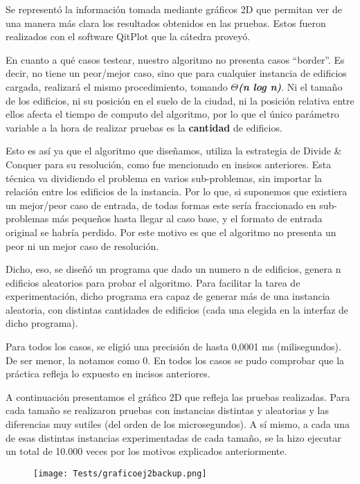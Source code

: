 Se representó la información tomada mediante gráficos 2D que permitan ver de una manera más clara los resultados obtenidos en las pruebas. Estos fueron realizados con el software QitPlot que la cátedra proveyó.

En cuanto a qué casos testear, nuestro algoritmo no presenta casos “border”. Es decir, no tiene un peor/mejor caso, sino que para cualquier instancia de edificios cargada, realizará el mismo procedimiento, tomando \textbf{$\Theta$\textit{(n log n)}}. Ni el tamaño de los edificios, ni su posición en el suelo de la ciudad, ni la posición relativa entre ellos afecta el tiempo de computo del algoritmo, por lo que el único parámetro variable a la hora de realizar pruebas es la \textbf{cantidad} de edificios.

Esto es así ya que el algoritmo que diseñamos, utiliza la estrategia de Divide \& Conquer para su resolución, como fue mencionado en insisos anteriores. Esta técnica va dividiendo el problema en varios sub-problemas, sin importar la relación entre los edificios de la instancia. Por lo que, si suponemos que existiera un mejor/peor caso de entrada, de todas formas este sería fraccionado en sub-problemas más pequeños hasta llegar al caso base, y el formato de entrada original se habría perdido. Por este motivo es que el algoritmo no presenta un peor ni un mejor caso de resolución.

Dicho, eso, se diseñó un programa que dado un numero n de edificios, genera n edificios aleatorios para probar el algoritmo. Para facilitar la tarea de experimentación, dicho programa era capaz de generar más de una instancia aleatoria, con distintas cantidades de edificios (cada una elegida en la interfaz de dicho programa).

Para todos los casos, se eligió una precisión de hasta 0,0001 ms (milisegundos). De ser menor, la notamos como 0.
En todos los casos se pudo comprobar que la práctica refleja lo expuesto en incisos anteriores.

A continuación presentamos el gráfico 2D que refleja las pruebas realizadas. Para cada tamaño se realizaron pruebas con instancias distintas y aleatorias y las diferencias muy sutiles (del orden de los microsegundos). A sí mismo, a cada una de esas distintas instancias experimentadas de cada tamaño, se la hizo ejecutar un total de 10.000 veces por los motivos explicados anteriormente.\\
	\begin{figure}[h]
		\begin{center}
		   \texttt{[image: Tests/graficoej2backup.png]}
		\end{center}
	\end{figure}